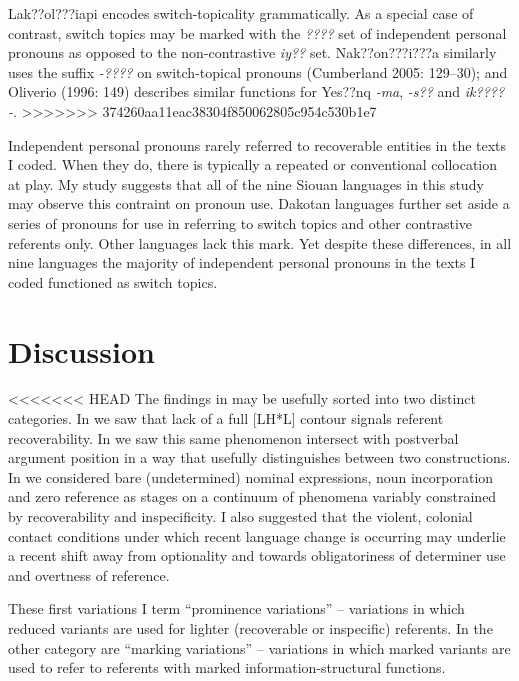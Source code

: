 \documentclass[output=paper]{LSP/langsci}
\begin{document}
	Lak??ol???iapi encodes switch-topicality grammatically. As a special case of contrast, switch topics may be marked with the \emph{????} set of independent personal pronouns as opposed to the non-contrastive \emph{iy??} set. Nak??on???i???a similarly uses the suffix \emph{-????} on switch-topical pronouns (Cumberland 2005: 129--30); and Oliverio (1996: 149) describes similar functions for Yes??nq \emph{-ma}, \emph{-s??} and \emph{ik????-}. 
>>>>>>> 374260aa11eac38304f850062805c954c530b1e7
	
	Independent personal pronouns rarely referred to recoverable entities in the texts I coded. When they do, there is typically a repeated or conventional collocation at play. My study suggests that all of the nine Siouan languages in this study may observe this contraint on pronoun use. Dakotan languages further set aside a series of pronouns for use in referring to switch topics and other contrastive referents only. Other languages lack this mark. Yet despite these differences, in all nine languages the majority of independent personal pronouns in the texts I coded functioned as switch topics.

\section{Discussion}\label{discussion}

<<<<<<< HEAD
The findings in  may be usefully sorted into two distinct categories. In  we saw that lack of a full [LH*L] contour signals referent recoverability. In  we saw this same phenomenon intersect with postverbal argument position in a way that usefully distinguishes between two constructions. In  we considered bare (undetermined) nominal expressions, noun incorporation and zero reference as stages on a continuum of phenomena variably constrained by recoverability and inspecificity. I also suggested that the violent, colonial contact conditions under which recent language change is occurring may underlie a recent shift away from optionality and towards obligatoriness of determiner use and overtness of reference. 

These first variations I term “prominence variations” -- variations in which reduced variants are used for lighter (recoverable or inspecific) referents. In the other category are “marking variations” -- variations in which marked variants are used to refer to referents with marked information-structural functions. 
\end{document}
